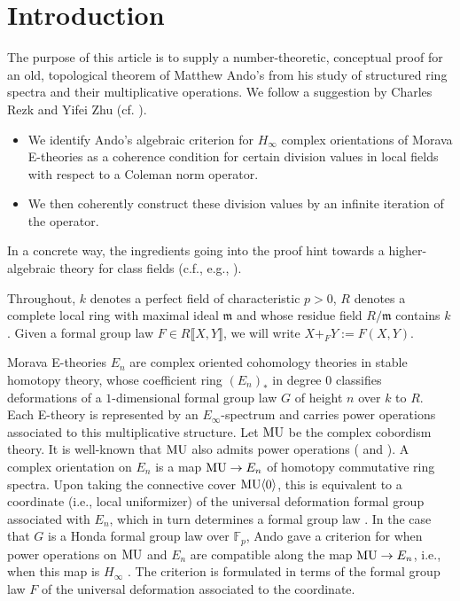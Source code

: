 \documentclass[12pt]{article}
\theoremstyle{definition}
\newcommand{\PS}[1]{\llbracket #1 \rrbracket}
\def\F{\mathbb{F}}
\def\MU{{\rm MU}}
\def\m{\mathfrak{m}}
\begin{document}
    \section{Introduction}
    The purpose of this article is to supply a number-theoretic, conceptual proof for an old, topological theorem of Matthew Ando's from his study of structured ring spectra and their multiplicative operations. We follow a suggestion by Charles Rezk and Yifei Zhu (cf. \cite[Remark 1.3]{Zhu20}). 
    \begin{itemize}
        \item We identify Ando's algebraic criterion for $H_\infty$ complex orientations of Morava E-theories as a coherence condition for certain division values in local fields with respect to a Coleman norm operator. 
        \item We then coherently construct these division values by an infinite iteration of the operator. 
    \end{itemize} 
    In a concrete way, the ingredients going into the proof hint towards a higher-algebraic theory for class fields (c.f., e.g., \cite{BSY22}). \par 
    Throughout, $k$ denotes a perfect field of characteristic $p > 0$, $R$ denotes a complete local ring with maximal ideal $\m$ and whose residue field $R/\m$ contains $k$. Given a formal group law $F \in R\PS{X,Y}$, we will write $X +_F Y := F(X,Y)$. \par 
    Morava E-theories $E_n$ are complex oriented cohomology theories in stable homotopy theory, whose coefficient ring $(E_n)_*$ in degree $0$ classifies deformations of a $1$-dimensional formal group law $G$ of height $n$ over $k$ to $R$. Each E-theory is represented by an $E_\infty$-spectrum \cite[Corollary 7.6]{GH04} and carries power operations associated to this multiplicative structure. Let $\MU$ be the complex cobordism theory. It is well-known that $\MU$ also admits power operations (\cite{TD68} and \cite[\S IV.2]{May77}). A complex orientation on $E_n$ is a map $\MU \to E_n$ of homotopy commutative ring spectra. Upon taking the connective cover $\MU\langle 0 \rangle$, this is equivalent to a coordinate (i.e., local uniformizer) of the universal deformation formal group associated with $E_n$, which in turn determines a formal group law \cite[Section 2]{Zhu20}. In the case that $G$ is a Honda formal group law over $\F_p$, Ando gave a criterion for when power operations on $\MU$ and $E_n$ are compatible along the map $\MU \to E_n$, i.e., when this map is $H_\infty$ \cite[Theorem 5]{And95}. The criterion is formulated in terms of the formal group law $F$ of the universal deformation associated to the coordinate. 
\end{document}
